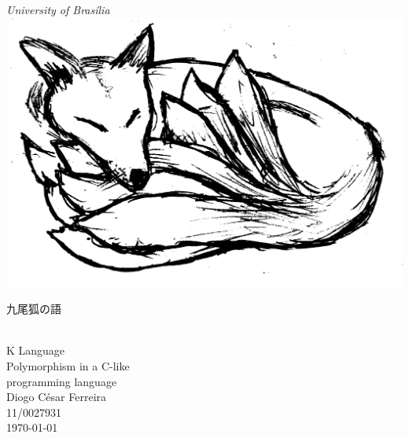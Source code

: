 \documentclass[12pt]{article}
\begin{document}
\begin{titlepage}
   \begin{center}

	\large
	\textit{University of Brasília} \\
	
    \vfill
	\includegraphics[width=0.27\linewidth]{../slides/kyu.png} \\
	
	\vspace*{0.3cm}
	\small
	\begin{CJK}{UTF8}{min}
		九\hspace{0.57cm}尾\hspace{0.57cm}狐\hspace{0.57cm}の\hspace{0.57cm}語
	\end{CJK} \\
	
	\huge K Language \vspace*{0.3cm} \\
	\normalsize
	Polymorphism in a C-like \\
	programming language \\

	\vspace*{3cm}
	\large
	Diogo César Ferreira\\
	\vspace*{0.3cm}
	11/0027931 \\
	
	\vfill
	\normalsize
	\today
   \end{center}
\end{titlepage}

\clearpage
\tableofcontents

\clearpage

 
 
 
 
 









\printbibliography[heading=bibnumbered]

%
\end{document}
